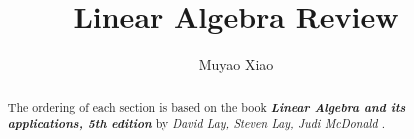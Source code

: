 \documentclass[a4paper]{report}
\title{Linear Algebra Review}
\author{Muyao Xiao}
\begin{document}
\maketitle

\begin{abstract}
 The ordering of each section is based on the book \textbf{\textit{Linear Algebra and its applications, 5th edition}} by  \textit{David Lay, Steven Lay, Judi McDonald }.
\end{abstract}

\tableofcontents







\pagestyle{plain}
\printbibliography{}
\end{document}
